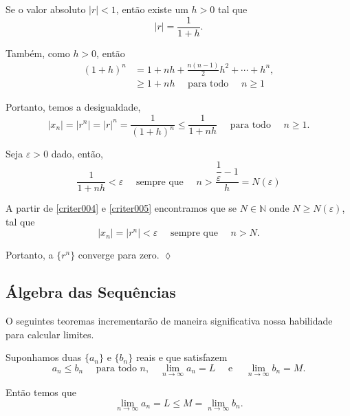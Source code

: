 \solo Se o valor absoluto $|r|<1$, ent\~{a}o existe um $h>0$ tal que
\begin{equation*}
    |r|=\frac{1}{1+h}.
\end{equation*}

Tamb\'{e}m, como $h>0$, ent\~{a}o
\begin{align*}
    (1+h)^n&=1+nh+\frac{n(n-1)}{2}h^2+\cdots+h^n,\\[2ex]
           &\geq 1+nh\quad \text{ para todo }\quad n \geq 1
\end{align*}

Portanto, temos a desigualdade,
\begin{equation}\label{criter004}
    |x_n|=|r^n|=|r|^n=\frac{1}{(1+h)^n}\leq \frac{1}{1+nh}\quad \text{ para todo }\quad n\geq 1.
\end{equation}

Seja $\varepsilon>0$ dado, ent\~{a}o,
\begin{equation}\label{criter005}
    \frac{1}{1+nh}<\varepsilon \quad \text{ sempre que }\quad n>\frac{\dfrac{1}{\varepsilon}-1}{h}=N(\varepsilon)
\end{equation}

A partir de \eqref{criter004} e \eqref{criter005} encontramos que se $N\in \mathbb{N}$ onde $N\geq N(\varepsilon)$, tal que
\begin{equation*}
    |x_n|=|r^n|<\varepsilon\quad \text{ sempre que }\quad n >N.
\end{equation*}

Portanto, a \seq $\{r^n\}$ converge para zero. \hfill \(\lozenge\)

\subsection{\'{A}lgebra das Sequ\^{e}ncias }
O seguintes teoremas incrementar\~{a}o de maneira significativa nossa
habilidade para calcular limites.

\begin{fteo}\label{limt002}
Suponhamos duas \seqs $\{ a_n\}$ e $\{b_n\}$ reais e que satisfazem
\begin{equation*}
    a_n\leq b_n\quad\text{ para todo }n,\quad \lim_{n\to\infty}a_n=L
    \quad\text{ e }\quad \lim_{n\to\infty} b_n=M.
\end{equation*}

Ent\~{a}o temos que
\begin{equation*}
\lim_{n\to\infty}a_n=L\leq M=\lim_{n\to\infty}b_{n}.
\end{equation*}
\end{fteo}

